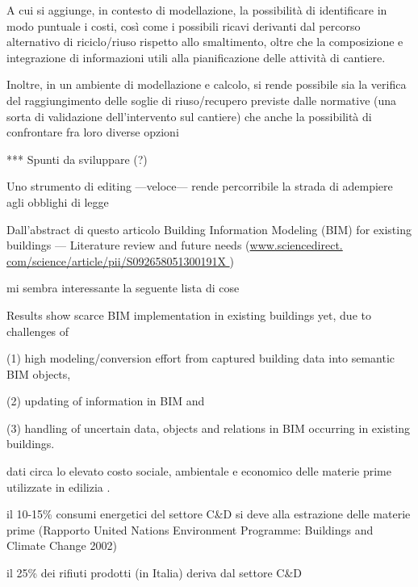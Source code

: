 A cui si aggiunge, in contesto di modellazione, la possibilità di identificare in modo puntuale i costi, così come i possibili ricavi derivanti dal percorso alternativo di riciclo/riuso rispetto allo smaltimento, oltre che la composizione e integrazione di informazioni utili alla pianificazione delle attività di cantiere.
 
Inoltre, in un ambiente di modellazione e calcolo, si rende possibile sia la verifica del raggiungimento delle soglie di riuso/recupero previste dalle normative (una sorta di validazione dell’intervento sul cantiere) che anche la possibilità di confrontare fra loro diverse opzioni  





*** Spunti da sviluppare (?)

Uno strumento di editing ---veloce--- rende percorribile la strada di adempiere agli obblighi di legge

Dall’abstract di questo articolo Building Information Modeling (BIM) for existing buildings — Literature review and future needs (\url{www.sciencedirect.
com/science/article/pii/S092658051300191X }) 

mi sembra interessante la seguente lista di cose 

Results show scarce BIM implementation in existing buildings yet, due to challenges of 

(1) high modeling/conversion effort from captured building data into semantic BIM objects, 

(2) updating of information in BIM and 

(3) handling of uncertain data, objects and relations in BIM occurring in existing buildings.


dati circa lo elevato costo sociale, ambientale e economico delle materie prime utilizzate in edilizia .

il 10-15\% consumi energetici del settore C\&D si deve alla estrazione delle materie prime (Rapporto United Nations Environment Programme: Buildings and Climate Change 2002)

il 25\% dei rifiuti prodotti (in Italia) deriva dal settore C\&D

